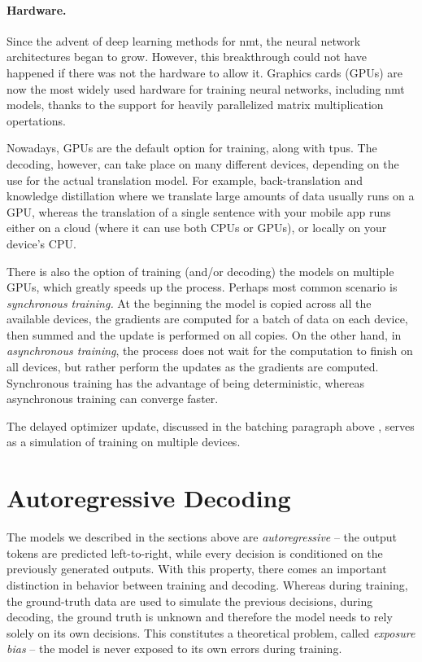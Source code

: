 \paragraph{Hardware.} Since the advent of deep learning methods for \ac{nmt},
the neural network architectures began to grow. However, this breakthrough
could not have happened if there was not the hardware to allow it. Graphics
cards (GPUs) are now the most widely used hardware for training neural
networks, including \ac{nmt} models, thanks to the support for heavily
parallelized matrix multiplication opertations.

Nowadays, GPUs are the default option for training, along with \acp{tpu}. The
decoding, however, can take place on many different devices, depending on the
use for the actual translation model. For example, back-translation and
knowledge distillation where we translate large amounts of data usually runs on
a GPU, whereas the translation of a single sentence with your mobile app runs
either on a cloud (where it can use both CPUs or GPUs), or locally on your
device's CPU.

There is also the option of training (and/or decoding) the models on multiple
GPUs, which greatly speeds up the process. Perhaps most common scenario is
\emph{synchronous training.} At the beginning the model is copied across all
the available devices, the gradients are computed for a batch of data on each
device, then summed and the update is performed on all copies. On the other
hand, in \emph{asynchronous training}, the process does not wait for the
computation to finish on all devices, but rather perform the updates as the
gradients are computed. Synchronous training has the advantage of being
deterministic, whereas asynchronous training can converge faster. 

The delayed optimizer update, discussed in the batching paragraph above
, serves as a simulation of training on multiple devices.

\section{Autoregressive Decoding}
\label{sec:decoding}

The models we described in the sections above are \emph{autoregressive} -- the
output tokens are predicted left-to-right, while every decision is conditioned
on the previously generated outputs. With this property, there comes an
important distinction in behavior between training and decoding. Whereas during
training, the ground-truth data are used to simulate the previous decisions,
during decoding, the ground truth is unknown and therefore the model needs to
rely solely on its own decisions. This constitutes a theoretical problem,
called \emph{exposure bias} -- the model is never exposed to its own errors
during training.


